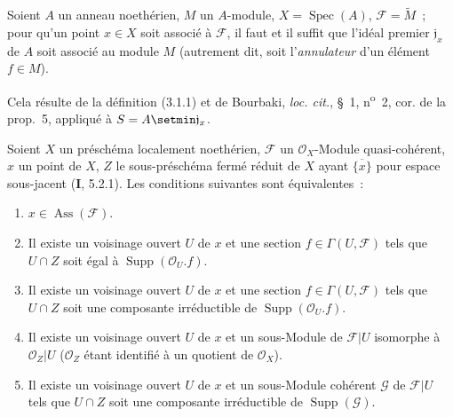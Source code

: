 \begin{proposition}[3.1.2]
\label{IV.2.3.1.2-fr}
Soient $A$ un anneau noethérien, $M$ un $A$-module,
$X=\operatorname{Spec}(A)$, $\mathcal F=\widetilde M$~; pour qu'un point
$x\in X$ soit associé à $\mathcal F$, il faut et il suffit que l'idéal
premier $\mathfrak j_x$ de $A$ soit associé au module $M$ \textup{(autrement dit,
soit l'\emph{annulateur} d'un élément $f\in M$)}.
\end{proposition}

Cela résulte de la définition (3.1.1) et de Bourbaki, \emph{loc. cit.},
\S~1, n\textsuperscript{o}~2, cor. de la prop.~5, appliqué à
$S=A\setmin\mathfrak j_x$.

\begin{proposition}[3.1.3]
\label{IV.2.3.1.3-fr}
Soient $X$ un préschéma localement noethérien, $\mathcal F$ un
$\mathcal O_X$-Module quasi-cohérent, $x$ un point de $X$, $Z$ le
sous-préschéma fermé réduit de $X$ ayant $\overline{\{x\}}$ pour espace
sous-jacent \textup{(\textbf{I}, 5.2.1)}. Les conditions suivantes sont équivalentes~:
\begin{enumerate}
\item[\emph{a)}] $x\in\operatorname{Ass}(\mathcal F)$.

\item[\emph{b)}] Il existe un voisinage ouvert $U$ de $x$ et une section
$f\in\Gamma(U,\mathcal F)$ tels que $U\cap Z$ soit égal à
$\operatorname{Supp}(\mathcal O_U.f)$.
\item[\emph{b$'$)}] Il existe un voisinage ouvert $U$ de $x$ et une section
$f\in\Gamma(U,\mathcal F)$ tels que $U\cap Z$ soit une composante
irréductible de $\operatorname{Supp}(\mathcal O_U.f)$.
\item[\emph{c)}] Il existe un voisinage ouvert $U$ de $x$ et un sous-Module
de $\mathcal F|U$ isomorphe à $\mathcal O_Z|U$ \textup{($\mathcal O_Z$ étant
identifié à un quotient de $\mathcal O_X$)}.
\item[\emph{c$'$)}] Il existe un voisinage ouvert $U$ de $x$ et un
sous-Module cohérent $\mathcal G$ de $\mathcal F|U$ tels que $U\cap Z$ soit
une composante irréductible de $\operatorname{Supp}(\mathcal G)$.
\end{enumerate}
\end{proposition}

